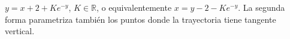 $y=x+2+Ke^{-y}$, $K\in\mathbb R$, o equivalentemente $x=y-2-Ke^{-y}$. La segunda forma parametriza también los puntos donde la trayectoria tiene tangente vertical.
